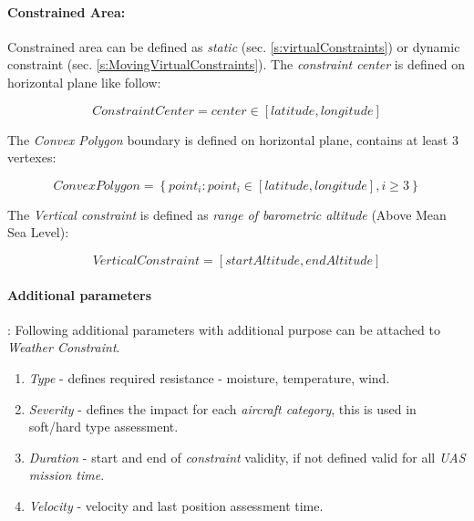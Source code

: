 \paragraph{Constrained Area:} Constrained area can be defined as \emph{static} (sec. \ref{s:virtualConstraints}) or dynamic constraint (sec. \ref{s:MovingVirtualConstraints}).  The \emph{constraint center} is defined on horizontal plane like follow:

\begin{equation}
    Constraint Center = center \in \left [latitude, longitude\right]
\end{equation}

\noindent The \emph{Convex Polygon} boundary is defined on horizontal plane, contains at least 3 vertexes:

\begin{equation}
    Convex Polygon = \left\{point_i:point_i\in \left [latitude, longitude\right], i \ge 3\right\}
\end{equation}

\noindent The \emph{Vertical constraint} is defined as \emph{range of barometric altitude} (Above Mean Sea Level):

\begin{equation}
    Vertical Constraint = \left [ start Altitude, end Altitude \right ]
\end{equation}

\newpage
\paragraph{Additional parameters}: Following additional parameters with additional purpose can be attached to \emph{Weather Constraint}.
\begin{enumerate}
    \item \emph{Type} - defines required resistance - moisture, temperature, wind.
    
    \item \emph{Severity} - defines the impact for each \emph{aircraft category}, this is used in soft/hard type assessment. 
    
    \item \emph{Duration} - start and end of \emph{constraint} validity, if not defined valid for all \emph{UAS mission time}.
    
    \item \emph{Velocity} - velocity and last position assessment time.
\end{enumerate}

